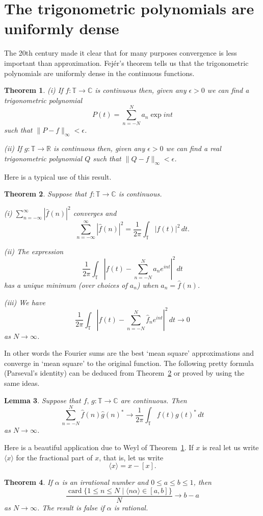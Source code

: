 \documentclass[12pt]{article}
\newtheorem{theorem}{Theorem}[section]
\newtheorem{lemma}[theorem]{Lemma}
\theoremstyle{definition}
\newcommand{\card}{\operatorname{card}}
\begin{document}
\section{The trigonometric polynomials are uniformly dense}
The 20th century made it clear that for many purposes
convergence is less important than approximation. 
Fej\'{e}r's theorem tells us that the trigonometric
polynomials are uniformly dense in the continuous functions.
\begin{theorem}\label{T, density} 
(i) If $f:{\mathbb T}\rightarrow{\mathbb C}$ 
is continuous then, given any $\epsilon>0$ we can find a 
trigonometric polynomial 
\[P(t)=\sum_{n=-N}^{N}a_{n}\exp int\]
such that $\|P-f\|_{\infty}<\epsilon$.

(ii) If $g:{\mathbb T}\rightarrow{\mathbb R}$ 
is continuous then, given any $\epsilon>0$ we can find a 
real trigonometric polynomial $Q$ 
such that $\|Q-f\|_{\infty}<\epsilon$.
\end{theorem}

Here is a typical use of this result.
\begin{theorem}\label{T, mean square} Suppose that
$f:{\mathbb T}\rightarrow{\mathbb C}$ 
is continuous.

(i) $\sum_{n=-\infty}^{\infty}|\hat{f}(n)|^{2}$ converges
and 
\[\sum_{n=-\infty}^{\infty}|\hat{f}(n)|^{2}=
\frac{1}{2\pi}\int_{\mathbb T}|f(t)|^{2}\,dt.\]

(ii) The expression
\[\frac{1}{2\pi}\int_{\mathbb T}\left|f(t)-\sum_{n=-N}^{N}a_{n}e^{int}\right|^{2}\,dt\]
has a unique minimum (over choices of $a_{n}$)  when $a_{n}=\hat{f}(n)$.

(iii) We have
\[\frac{1}{2\pi}\int_{\mathbb T}\left|f(t)-\sum_{n=-N}^{N}\hat{f}_{n}e^{int}\right|^{2}\,dt
\rightarrow 0\]
as $N\rightarrow\infty$.
\end{theorem}
In other words the Fourier sums are the best `mean square' approximations
and converge in `mean square' to the original function. The following
pretty formula (Parseval's identity) can be deduced from Theorem~\ref{T, mean square}
or proved by using the same ideas.
\begin{lemma} Suppose that
$f,\,g:{\mathbb T}\rightarrow{\mathbb C}$ 
are continuous. Then 
\[\sum_{n=-N}^{N}\hat{f}(n)\hat{g}(n)^{*}\rightarrow
\frac{1}{2\pi}\int_{\mathbb T}f(t)g(t)^{*}\,dt\]
as $N\rightarrow\infty$.
\end{lemma}  

Here is a beautiful application due to Weyl
of Theorem~\ref{T, density}. If $x$ is real
let us write $\langle x\rangle$ for the fractional part
of $x$, that is, let us write
\[\langle x\rangle=x-[x].\]
\begin{theorem}\label{Weyl} If $\alpha$ is an irrational
number and $0\leq a\leq b\leq 1$, then
\[\frac{\card\{1\leq n\leq N \mid \langle n\alpha\rangle
\in [a,b]\}}{N}
\rightarrow b-a\]
as $N\rightarrow\infty$. The result is false
if $\alpha$ is rational.
\end{theorem}
\end{document}
